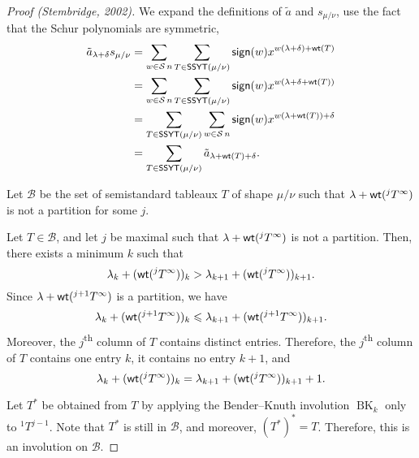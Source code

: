 \begin{proof}[Proof (Stembridge, 2002)]
    We expand the definitions of \(\tilde{a}\) and \(s_{\mu/\nu}\),
    use the fact that the Schur polynomials are symmetric,
    \begin{align}
        \tilde{a}_{\lambda + \delta} s_{\mu/\nu}
        &= 
        \sum_{w \in \operatorname{\mathcal{S}}{n}}
        \sum_{T \in \operatorname{\mathsf{SSYT}}(\mu/\nu)}
        \operatorname{\mathsf{sign}}(w) x^{w(\lambda + \delta) + \operatorname{\mathsf{wt}}(T)} \\
        &=
        \sum_{w \in \operatorname{\mathcal{S}}{n}}
        \sum_{T \in \operatorname{\mathsf{SSYT}}(\mu/\nu)}
        \operatorname{\mathsf{sign}}(w) x^{w(\lambda + \delta + \operatorname{\mathsf{wt}}(T))} \\
        &=
        \sum_{T \in \operatorname{\mathsf{SSYT}}(\mu/\nu)}
        \sum_{w \in \operatorname{\mathcal{S}}{n}}
        \operatorname{\mathsf{sign}}(w) x^{w(\lambda + \operatorname{\mathsf{wt}}(T)) + \delta} \\
        &=
        \sum_{T \in \operatorname{\mathsf{SSYT}}(\mu/\nu)}
        \tilde{a}_{\lambda + \operatorname{\mathsf{wt}}(T) + \delta}.
    \end{align}

    Let \(\mathcal{B}\) be the set of semistandard tableaux \(T\) of shape \(\mu/\nu\) such that \(\lambda + \operatorname{\mathsf{wt}}(^jT^\infty)\) is not a partition for some \(j\).

    Let \(T \in \mathcal{B}\), and let \(j\) be maximal such that \(\lambda + \operatorname{\mathsf{wt}}(^jT^\infty)\) is not a partition.
    Then, there exists a minimum \(k\) such that
    \begin{equation}
        \lambda_k + (\operatorname{\mathsf{wt}}(^jT^\infty))_k > \lambda_{k+1} + (\operatorname{\mathsf{wt}}(^jT^\infty))_{k+1}.
    \end{equation}
    Since \(\lambda + \operatorname{\mathsf{wt}}(^{j+1}T^\infty)\) is a partition, we have
    \begin{equation}
        \lambda_k + (\operatorname{\mathsf{wt}}(^{j+1}T^\infty))_k \leqslant \lambda_{k+1} + (\operatorname{\mathsf{wt}}(^{j+1}T^\infty))_{k+1}.
    \end{equation}
    Moreover, the \(j\)\textsuperscript{th} column of \(T\) contains distinct entries.
    Therefore, the \(j\)\textsuperscript{th} column of \(T\) contains one entry \(k\), it contains no entry \(k+1\), and
    \begin{equation} \label{eq:skew-tilde-a-1}
        \lambda_k + (\operatorname{\mathsf{wt}}(^jT^\infty))_k = \lambda_{k+1} + (\operatorname{\mathsf{wt}}(^jT^\infty))_{k+1} + 1.
    \end{equation}

    Let \(T^*\) be obtained from \(T\) by applying the Bender--Knuth involution \(\operatorname{BK}_k\) only to \(^1T^{j-1}\).
    Note that \(T^*\) is still in \(\mathcal{B}\),
    and moreover, \((T^*)^* = T\).
    Therefore, this is an involution on \(\mathcal{B}\).


\end{proof}

